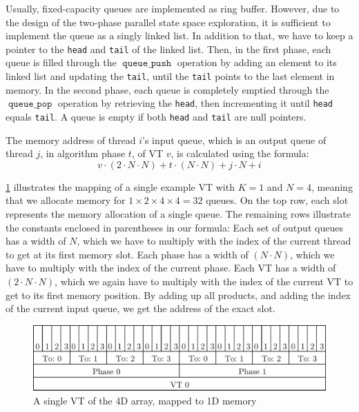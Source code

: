 \documentclass[
fancyheadings, %
%
%
]{stsreprt}
\DeclareMathOperator{\qPop}{\texttt{queue\_pop}}
\DeclareMathOperator{\qPush}{\texttt{queue\_push}}
\begin{document}
Usually, fixed-capacity queues are implemented as ring buffer.
However, due to the design of the two-phase parallel state space exploration, it is sufficient to implement the queue as a singly linked list.
In addition to that, we have to keep a pointer to the \texttt{head} and \texttt{tail} of the linked list.
Then, in the first phase, each queue is filled through the $\qPush$ operation by adding an element to its linked list and updating the \texttt{tail}, until the \texttt{tail} points to the last element in memory.
In the second phase, each queue is completely emptied through the $\qPop$ operation by retrieving the \texttt{head}, then incrementing it until \texttt{head} equals \texttt{tail}.
A queue is empty if both \texttt{head} and \texttt{tail} are null pointers.

The memory address of thread $i$'s input queue, which is an output queue of thread $j$, in algorithm phase $t$, of VT $v$, is calculated using the formula:
\[v \cdot (2 \cdot N \cdot N) + t \cdot (N \cdot N) + j \cdot N + i\]

\cref{fig:4d-mapped-memory} illustrates the mapping of a single example VT with $K=1$ and $N=4$, meaning that we allocate memory for $1 \times 2 \times 4 \times 4 = 32$ queues.
On the top row, each slot represents the memory allocation of a single queue.
The remaining rows illustrate the constants enclosed in parentheses in our formula:
Each set of output queues has a width of $N$, which we have to multiply with the index of the current thread to get at its first memory slot.
Each phase has a width of $(N \cdot N)$, which we have to multiply with the index of the current phase.
Each VT has a width of $(2 \cdot N \cdot N)$, which we again have to multiply with the index of the current VT to get to its first memory position.
By adding up all products, and adding the index of the current input queue, we get the address of the exact slot.

\begin{figure}[h]
    \includegraphics[width=\textwidth]{figures/4d-mapped-memory}
    \caption{A single VT of the 4D array, mapped to 1D memory}
    \label{fig:4d-mapped-memory}
\end{figure}
\end{document}

